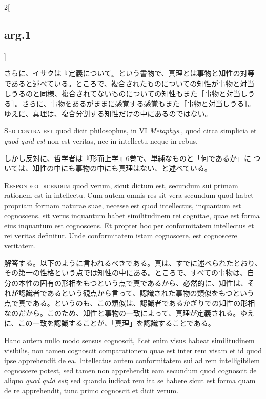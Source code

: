 \documentclass[paper=a4paper,fontsize=10pt,jafontsize=9pt,titlepage]{jlreq}
\begin{document}
\begin{paracol}{2}[\subsection{arg.1}]
\switchcolumn

さらに、イサクは『定義について』という書物で、真理とは事物と知性の対等
であると述べている。ところで、複合されたものについての知性が事物と対当
しうるのと同様、複合されてないものについての知性もまた［事物と対当しう
る］。さらに、事物をあるがままに感覚する感覚もまた［事物と対当しうる］。
ゆえに、真理は、複合分割する知性だけの中にあるのではない。

\switchcolumn*[\subsection{s.c.}]


{\scshape Sed contra est} quod dicit philosophus, in VI {\itshape
Metaphys}., quod circa simplicia et {\itshape quod quid est} non est
veritas, nec in intellectu neque in rebus.

\switchcolumn

しかし反対に、哲学者は『形而上学』6巻で、単純なものと「何であるか」に
 ついては、知性の中にも事物の中にも真理はない、と述べている。



{\scshape Respondeo dicendum} quod verum, sicut dictum est, secundum
sui primam rationem est in intellectu. Cum autem omnis res sit vera
secundum quod habet propriam formam naturae suae, necesse est quod
intellectus, inquantum est cognoscens, sit verus inquantum habet
similitudinem rei cognitae, quae est forma eius inquantum est
cognoscens. Et propter hoc per conformitatem intellectus et rei
veritas definitur. Unde conformitatem istam cognoscere, est cognoscere
veritatem.

\switchcolumn

解答する。以下のように言われるべきである。真は、すでに述べられたとおり、
その第一の性格という点では知性の中にある。ところで、すべての事物は、自
分の本性の固有の形相をもつという点で真であるから、必然的に、知性は、そ
れが認識者であるという観点から言って、認識された事物の類似をもつという
点で真である。というのも、この類似は、認識者であるかぎりでの知性の形相
なのだから。このため、知性と事物の一致によって、真理が定義される。ゆえ
に、この一致を認識することが、「真理」を認識することである。

\switchcolumn*


Hanc autem nullo modo sensus cognoscit, licet enim visus habeat
similitudinem visibilis, non tamen cognoscit comparationem quae est
inter rem visam et id quod ipse apprehendit de ea. Intellectus autem
conformitatem sui ad rem intelligibilem cognoscere potest, sed tamen
non apprehendit eam secundum quod cognoscit de aliquo {\itshape quod
quid est}; sed quando iudicat rem ita se habere sicut est forma quam
de re apprehendit, tunc primo cognoscit et dicit verum.


\end{paracol}
\end{document}
